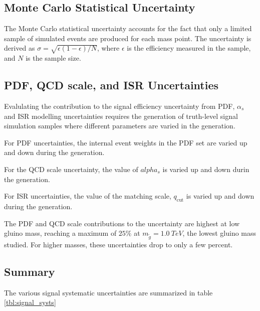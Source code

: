 \subsection{Monte Carlo Statistical Uncertainty}
The Monte Carlo statistical uncertainty accounts for the fact that
only a limited sample of simulated events are produced for each mass
point. The uncertainty is derived as
$\sigma=\sqrt{\epsilon(1-\epsilon)/N}$, where $\epsilon$ is the
efficiency measured in the sample, and $N$ is the sample size.


\subsection{PDF, QCD scale, and ISR Uncertainties}
Evalulating the contribution to the signal efficiency uncertainty from
PDF, $\alpha_s$ and ISR modelling uncertainties requires the
generation of truth-level signal simulation samples where different
parameters are varied in the generation.

For PDF uncertainties, the internal event weights in the PDF set are varied up and
down during the generation. 

For the QCD scale uncertainty, the value of $alpha_s$ is varied up and
down durin the generation.

For ISR uncertainties, the value of the matching scale,
$q_{\textrm{cut}}$ is varied up and down during the generation.

The PDF and QCD scale contributions to the uncertainty are highest at
low gluino mass, reaching a maximum of $25\%$ at
$m_{\tilde{g}}=1.0~TeV$, the lowest gluino mass studied. For higher
masses, these uncertainties drop to only a few percent.

\subsection{Summary}
The various signal systematic uncertainties are summarized in table
\ref{tbl:signal_systs}
